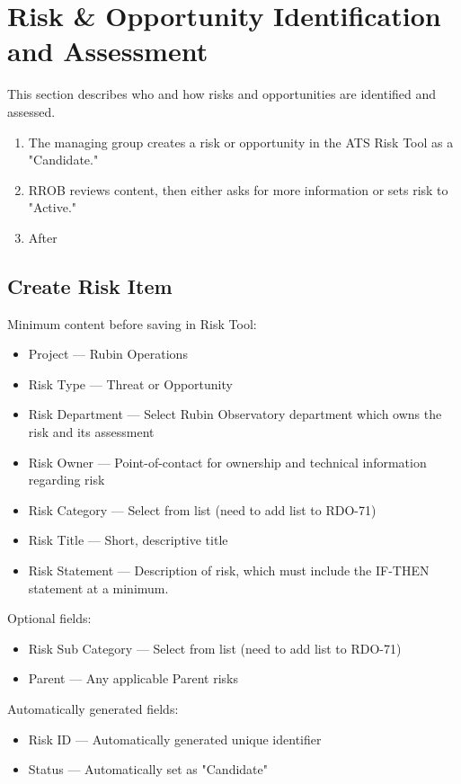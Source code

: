 \section{Risk \& Opportunity Identification and Assessment}
\label{sec:id-assess}

This section describes who and how risks and opportunities are identified and assessed.


\begin{enumerate}
	\item The managing group creates a risk or opportunity in the ATS Risk Tool as a "Candidate."
	\item RROB reviews content, then either asks for more information or sets risk to "Active."
	\item After 
\end{enumerate}

\subsection{Create Risk Item}

Minimum content before saving in Risk Tool:
\begin{itemize}
	\item Project --- Rubin Operations
	\item Risk Type --- Threat or Opportunity
	\item Risk Department --- Select Rubin Observatory department which owns the risk and its assessment
	\item Risk Owner --- Point-of-contact for ownership and technical information regarding risk
	\item Risk Category --- Select from list (need to add list to RDO-71)
	\item Risk Title --- Short, descriptive title
	\item Risk Statement --- Description of risk, which must include the IF-THEN statement at a minimum.
\end{itemize}

Optional fields:
\begin{itemize}
	\item Risk Sub Category --- Select from list (need to add list to RDO-71)
	\item Parent --- Any applicable Parent risks
\end{itemize}

Automatically generated fields:
\begin{itemize}
	\item Risk ID --- Automatically generated unique identifier
	\item Status --- Automatically set as "Candidate"
\end{itemize}

